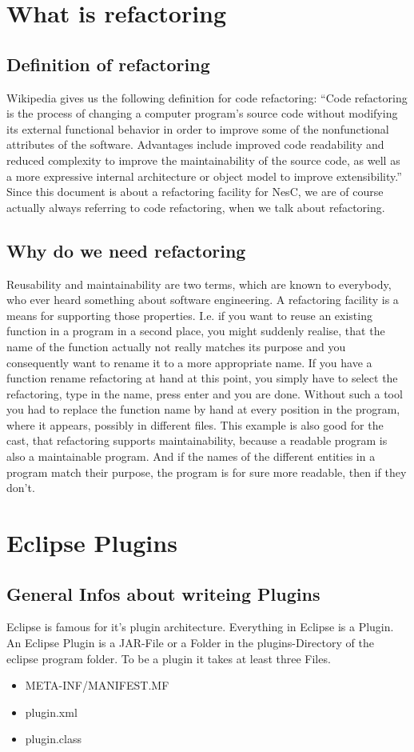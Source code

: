 \documentclass[a4paper,10pt]{report}
\begin{document}
\tableofcontents

\part{What is refactoring}
\chapter{Definition of refactoring}
Wikipedia gives us the following definition for code refactoring:
``Code refactoring is the process of changing a computer program's source code without modifying its external functional behavior in order to improve some of the nonfunctional attributes of the software. 
Advantages include improved code readability  and reduced complexity to improve the maintainability of the source code, as well as a more expressive internal architecture or object model to improve extensibility.''
Since this document is about a refactoring facility for NesC, we are of course actually always referring to code refactoring, when we talk about refactoring.

\chapter{Why do we need refactoring}
Reusability and maintainability are two terms, which are known to everybody, who ever heard something about software engineering. 
A refactoring facility is a means for supporting those properties. I.e. if you want to reuse an existing function in a program in a second place,
you might suddenly realise, that the name of the function actually not really matches its purpose and you consequently want to rename it to a more appropriate name.
If you have a function rename refactoring at hand at this point, you simply have to select the refactoring, type in the name, press enter and you are done. 
Without such a tool you had to replace the function name by hand at every position in the program, where it appears, possibly in different files.
This example is also good for the cast, that refactoring supports maintainability, because a readable program is also a maintainable program. 
And if the names of the different entities in a program match their purpose, the program is for sure more readable, then if they don't.

\part{Eclipse Plugins}
\chapter{General Infos about writeing Plugins}
Eclipse is famous for it's plugin architecture. Everything in Eclipse is a Plugin. An Eclipse Plugin is a JAR-File or a Folder in the plugins-Directory of the eclipse program folder.
To be a plugin it takes at least three Files.
\begin{itemize}
  \item META-INF/MANIFEST.MF
  \item plugin.xml
  \item plugin.class
\end{itemize}
\end{document}
